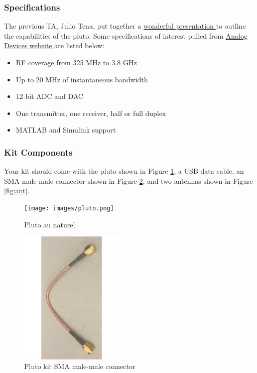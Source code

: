\subsubsection{Specifications}
The previous TA, Julio Tena, put together a \href{https://github.com/rjmacaranas/ee-504/blob/main/lab1/ADALM_PLUT0_INTRO.pptx}{wonderful presentation }to outline the capabilities of the pluto.  Some specifications of interest pulled from \href{https://www.analog.com/en/design-center/evaluation-hardware-and-software/evaluation-boards-kits/adalm-pluto.html#eb-overview}{Analog Devices website }are listed below:
\begin{itemize}
    \item RF coverage from 325 MHz to 3.8 GHz
    \item Up to 20 MHz of instantaneous bandwidth
    \item 12-bit ADC and DAC
    \item One transmitter, one receiver, half or full duplex
    \item MATLAB and Simulink support
\end{itemize}

\subsubsection{Kit Components}
Your kit should come with the pluto shown in Figure \ref{fig:pluto}, a USB data cable, an SMA male-male connector shown in Figure \ref{fig:sma}, and two antennas shown in Figure \ref{fig:ant}.

\begin{figure}[] \label{pluto}
    \centering
    \texttt{[image: images/pluto.png]}
    \caption{Pluto au naturel}
    \label{fig:pluto}
\end{figure}

\begin{figure}
    \centering
    \includegraphics[scale=0.5, width=50mm]{images/hard_wired_sma.pdf}
    \caption{Pluto kit SMA male-male connector}
    \label{fig:sma}
\end{figure}

